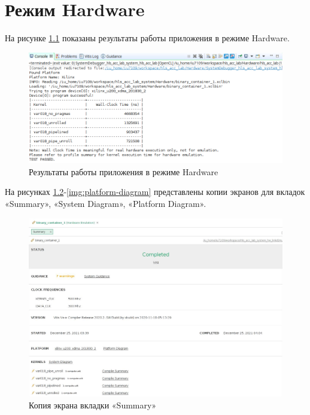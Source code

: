 \chapter{Режим Hardware}

На рисунке \ref{img:hardware} показаны результаты работы приложения в режиме Hardware.

\begin{figure}[H]
	\begin{center}
		\includegraphics[scale=0.5]{img/hardware.png}
	\end{center}
	\captionsetup{justification=centering}
	\caption{Результаты работы приложения в режиме Hardware}
	\label{img:hardware}
\end{figure}

На рисунках \ref{img:summary}-\ref{img:platform-diagram} представлены копии экранов для вкладок «Summary», «System Diagram», «Platform Diagram».

\begin{figure}[H]
	\begin{center}
		\includegraphics[scale=0.4]{img/summary.png}
	\end{center}
	\captionsetup{justification=centering}
	\caption{Копия экрана вкладки «Summary»}
	\label{img:summary}
\end{figure}

